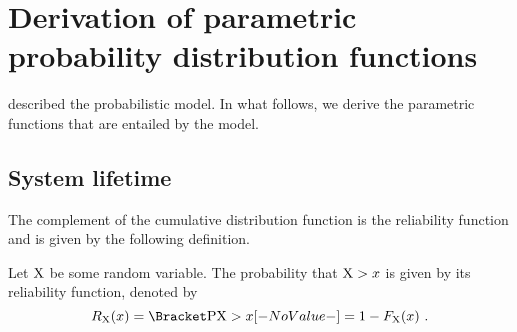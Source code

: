 \documentclass[../main.tex]{subfiles}
\begin{document}
\label{sec:distribution_functions}
\chapter{Derivation of parametric probability distribution functions}
 described the probabilistic model. In what follows, we derive the parametric functions that are entailed by the model.

\section{System lifetime}
The complement of the cumulative distribution function is the reliability 
function and is given by the following definition.
\begin{definition}
    \label{def:rel_function}
    Let $\mathrm{X}$ be some random variable. The probability that $\mathrm{X} > x$ is 
    given by its reliability function, denoted by
    \begin{equation}
    \label{eq:rel_function}
    \srv_{\RV{X}}\!\left(x\right) = \Prob{\RV{X} > x} = 1 - 
    \cdf_{\RV{X}}\!\left(x\right)\,.
    \end{equation}
\end{definition}
\end{document}
